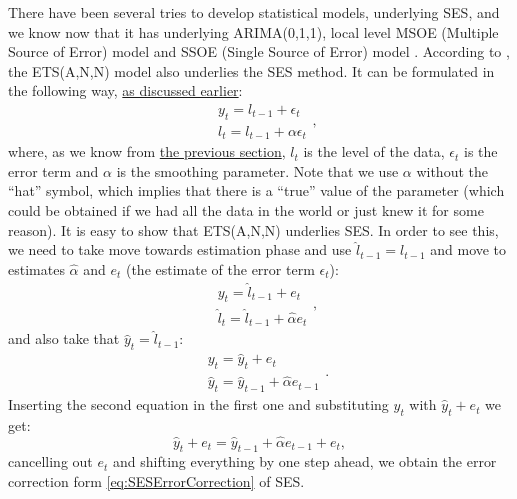 \documentclass[
]{book}
\theoremstyle{definition}
\theoremstyle{definition}
\theoremstyle{definition}
\theoremstyle{definition}
\theoremstyle{remark}
\begin{document}
There have been several tries to develop statistical models, underlying SES, and we know now that it has underlying ARIMA(0,1,1), local level MSOE (Multiple Source of Error) model \citep{Muth1960} and SSOE (Single Source of Error) model \citep{Snyder1985}. According to \citep{Hyndman2002}, the ETS(A,N,N) model also underlies the SES method. It can be formulated in the following way, \protect\hyperlink{ETSTaxonomyMaths}{as discussed earlier}:
\begin{equation}
  \begin{aligned}
    & y_{t} = l_{t-1} + \epsilon_t \\
    & l_t = l_{t-1} + \alpha \epsilon_t
  \end{aligned} ,
  \label{eq:ETSANN}
\end{equation}
where, as we know from \protect\hyperlink{tsComponents}{the previous section}, \(l_t\) is the level of the data, \(\epsilon_t\) is the error term and \(\alpha\) is the smoothing parameter. Note that we use \(\alpha\) without the ``hat'' symbol, which implies that there is a ``true'' value of the parameter (which could be obtained if we had all the data in the world or just knew it for some reason). It is easy to show that ETS(A,N,N) underlies SES. In order to see this, we need to take move towards estimation phase and use \(\hat{l}_{t-1}=l_{t-1}\) and move to estimates \(\hat{\alpha}\) and \(e_t\) (the estimate of the error term \(\epsilon_t\)):
\begin{equation}
  \begin{aligned}
    & y_{t} = \hat{l}_{t-1} + e_t \\
    & \hat{l}_t = \hat{l}_{t-1} + \hat{\alpha} e_t
  \end{aligned} ,
  \label{eq:ETSANNEstimation}
\end{equation}
and also take that \(\hat{y}_t=\hat{l}_{t-1}\):
\begin{equation}
  \begin{aligned}
    & y_{t} = \hat{y}_{t} + e_t \\
    & \hat{y}_{t} = \hat{y}_{t-1} + \hat{\alpha} e_{t-1}
  \end{aligned} .
  \label{eq:ETSANNEstimation2}
\end{equation}
Inserting the second equation in the first one and substituting \(y_t\) with \(\hat{y}_t+e_t\) we get:
\begin{equation}
    \hat{y}_t+e_t = \hat{y}_{t-1} + \hat{\alpha} e_{t-1} + e_t ,
  \label{eq:ETSANNEstimation3}
\end{equation}
cancelling out \(e_t\) and shifting everything by one step ahead, we obtain the error correction form \eqref{eq:SESErrorCorrection} of SES.
\end{document}
